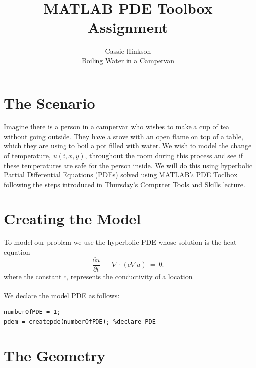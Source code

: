 \documentclass[12pt]{article}  %
\title{MATLAB PDE Toolbox Assignment}
\author{Cassie Hinkson\\
Boiling Water in a Campervan}
\begin{document}
\maketitle

\section{The Scenario}\label{s:intro}
%
\paragraph{} Imagine there is a person in a campervan who wishes to make a cup of tea without going outside. They have a stove with an open flame on top of a table, which they are using to boil a pot filled with water. We wish to model the change of temperature, $u(t,x,y)$, throughout the room during this process and see if these temperatures are safe for the person inside. We will do this using hyperbolic Partial Differential Equations (PDEs) solved using MATLAB's PDE Toolbox following the steps introduced in Thursday's Computer Tools and Skills lecture. 

\section{Creating the Model}
\paragraph{} To model our problem we use the hyperbolic PDE whose solution is the heat equation
\begin{equation*}
\frac{\partial u}{\partial t} \ - \ \nabla \cdot \left( c\nabla u\right) \ = \ 0.
\end{equation*}where the constant $c$, represents the conductivity of a location.
\paragraph{} We declare the model PDE as follows:

\begin{lstlisting}
numberOfPDE = 1;
pdem = createpde(numberOfPDE); %declare PDE
\end{lstlisting}

\section{The Geometry}
\end{document}

